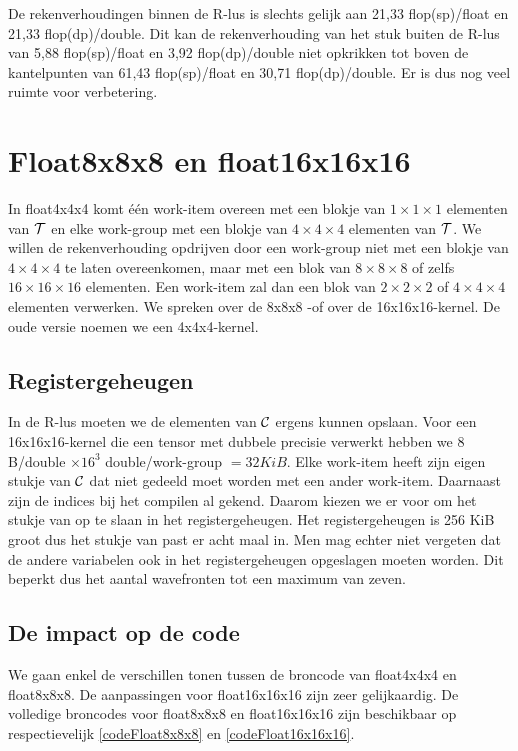 De rekenverhoudingen binnen de R-lus is slechts gelijk aan 21,33 flop(sp)/float en 21,33 flop(dp)/double. Dit kan de rekenverhouding van het stuk buiten de R-lus van 5,88 flop(sp)/float en 3,92 flop(dp)/double niet opkrikken tot boven de kantelpunten van 61,43 flop(sp)/float en 30,71 flop(dp)/double. Er is dus nog veel ruimte voor verbetering.

\section{Float8x8x8 en float16x16x16}
In float4x4x4 komt \'e\'en work-item overeen met een blokje van $1 \times 1 \times 1$ elementen van $\mathcal{T}$ en elke work-group met een blokje van $4 \times 4 \times 4$ elementen van $\mathcal{T}$. We willen de rekenverhouding opdrijven door een work-group niet met een blokje van $4 \times 4 \times 4$ te laten overeenkomen, maar met een blok van $8 \times 8 \times 8$ of zelfs $16 \times 16 \times 16$ elementen. Een work-item zal dan een blok van $2 \times 2 \times 2$ of $4 \times 4 \times 4$ elementen verwerken. We spreken over de 8x8x8 -of over de 16x16x16-kernel. De oude versie noemen we een 4x4x4-kernel.



\subsection{Registergeheugen}
In de R-lus moeten we de elementen van $\mathcal{C}$ ergens kunnen opslaan. Voor een 16x16x16-kernel die een tensor met dubbele precisie verwerkt hebben we $8$ B/double $\times 16^3$ double/work-group $= 32KiB$. Elke work-item heeft zijn eigen stukje van $\mathcal{C}$ dat niet gedeeld moet worden met een ander work-item. Daarnaast zijn de indices bij het compilen al gekend. Daarom kiezen we er voor om het stukje van \CC{} op te slaan in het registergeheugen. Het registergeheugen is 256 KiB groot dus het stukje van \CC{} past er acht maal in.  Men mag echter niet vergeten dat de andere variabelen ook in het registergeheugen opgeslagen moeten worden.  Dit beperkt dus het aantal wavefronten tot een maximum van zeven. 

\subsection{De impact op de code}
We gaan enkel de verschillen tonen tussen de broncode van float4x4x4 en float8x8x8. De aanpassingen voor float16x16x16 zijn zeer gelijkaardig. De volledige broncodes voor float8x8x8 en float16x16x16 zijn beschikbaar op respectievelijk \ref{codeFloat8x8x8} en \ref{codeFloat16x16x16}.
 
